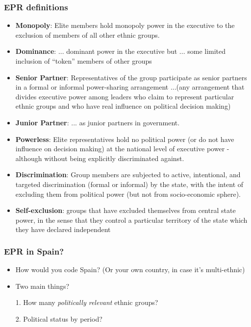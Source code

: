 \documentclass[aspectratio=43]{beamer}
\begin{document}
\begin{frame}
\frametitle{EPR definitions}
\centering

{\scriptsize
\begin{itemize}
\setlength\itemsep{0pt}
  \item \textbf{Monopoly}: Elite members hold monopoly power in the executive to the exclusion of members of all other ethnic groups.
  \item \textbf{Dominance}: ... dominant power in the executive but ... some limited inclusion of “token” members of other groups
  \item \textbf{Senior Partner}: Representatives of the group participate as senior partners in a formal or informal power-sharing arrangement ...(any arrangement that divides executive power among leaders who claim to represent particular ethnic groups and who have real influence on political decision making)
  \item \textbf{Junior Partner}: ... as junior partners in government.
  \item \textbf{Powerless}: Elite representatives hold no political power (or do not have influence on decision making) at the national level of executive power - although without being explicitly discriminated against.
  \item \textbf{Discrimination}: Group members are subjected to active, intentional, and targeted discrimination (formal or informal) by the state, with the intent of excluding them from political power (but not from socio-economic sphere).
  \item \textbf{Self-exclusion}: groups that have excluded themselves from central state power, in the sense that they control a particular territory of the state which they have declared independent
\end{itemize}
}

\end{frame}

\begin{frame}
\frametitle{EPR in Spain?}
\centering

\begin{itemize}
  \item How would you code Spain? (Or your own country, in case it's multi-ethnic)
  \item Two main things?
  \item[1.] How many \textit{politically relevant} ethnic groups?
  \item[2.] Political status by period?
\end{itemize}

\end{frame}
\end{document}
